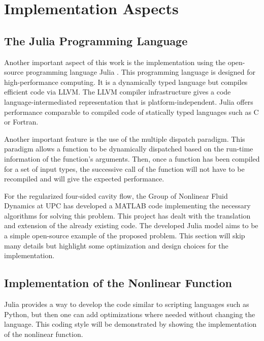 
\section{Implementation Aspects} \label{sec:impl}

\subsection{The Julia Programming Language}

Another important aspect of this work is the implementation using the
open-source programming language Julia \citep{bezanson2017}. This programming
language is designed for high-performance computing. It is a dynamically typed
language but compiles efficient code via LLVM. The LLVM compiler infrastructure
gives a code language-intermediated representation that is
platform-independent. Julia offers performance comparable to compiled code of
statically typed languages such as C or Fortran.

Another important feature is the use of the multiple dispatch paradigm. This
paradigm allows a function to be dynamically dispatched based on the run-time
information of the function's arguments. Then, once a function has been
compiled for a set of input types, the successive call of the function will not
have to be recompiled and will give the expected performance. 

For the regularized four-sided cavity flow, the Group of Nonlinear Fluid
Dynamics at UPC has developed a MATLAB code implementing the necessary
algorithms for solving this problem. This project has dealt with the
translation and extension of the already existing code. The developed Julia
model aims to be a simple open-source example of the proposed problem. This
section will skip many details but highlight some optimization and design
choices for the implementation.

\subsection{Implementation of the Nonlinear Function}

Julia provides a way to develop the code similar to scripting languages such as
Python, but then one can add optimizations where needed without changing the
language. This coding style will be demonstrated by showing the implementation
of the nonlinear function. 

